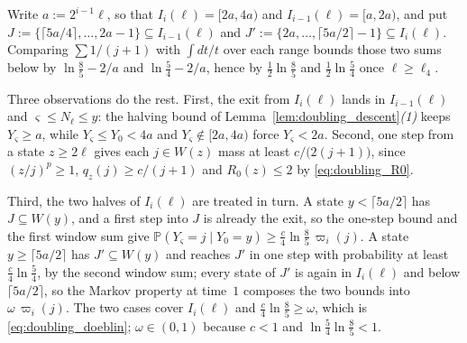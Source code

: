 Write $a:=2^{i-1}\ell$, so that $I_i(\ell)=[2a,4a)$ and $I_{i-1}(\ell)=[a,2a)$, and put
$J:=\{\lceil5a/4\rceil,\dots,2a-1\}\subseteq I_{i-1}(\ell)$ and
$J':=\{2a,\dots,\lceil5a/2\rceil-1\}\subseteq I_i(\ell)$. Comparing $\sum1/(j+1)$ with
$\int dt/t$ over each range bounds those two sums below by $\ln\tfrac85-2/a$ and
$\ln\tfrac54-2/a$, hence by $\tfrac12\ln\tfrac85$ and $\tfrac12\ln\tfrac54$ once
$\ell\geq\ell_4$.

Three observations do the rest. First, the exit from $I_i(\ell)$ lands in $I_{i-1}(\ell)$ and
$\varsigma\leq N_\ell\leq y$: the halving bound of
Lemma~\ref{lem:doubling_descent}\emph{(1)} keeps $Y_\varsigma\geq a$, while
$Y_\varsigma\leq Y_0<4a$ and $Y_\varsigma\notin[2a,4a)$ force $Y_\varsigma<2a$. Second, one
step from a state $z\geq2\ell$ gives each $j\in W(z)$ mass at least $c/\bigl(2(j+1)\bigr)$,
since $(z/j)^{p}\geq1$, $q_z(j)\geq c/(j+1)$ and $R_0(z)\leq2$ by \eqref{eq:doubling_R0}.

Third, the two halves of $I_i(\ell)$ are treated in turn. A state $y<\lceil5a/2\rceil$ has
$J\subseteq W(y)$, and a first step into $J$ is already the exit, so the one-step bound and
the first window sum give
$\mathbb P(Y_\varsigma=j\mid Y_0=y)\geq\tfrac c4\ln\tfrac85\,\varpi_i(j)$. A state
$y\geq\lceil5a/2\rceil$ has $J'\subseteq W(y)$ and reaches $J'$ in one step with probability
at least $\tfrac c4\ln\tfrac54$, by the second window sum; every state of $J'$ is again in $I_i(\ell)$ and below
$\lceil5a/2\rceil$, so the Markov property at time~$1$ composes the two bounds into
$\omega\,\varpi_i(j)$. The two cases cover $I_i(\ell)$ and $\tfrac c4\ln\tfrac85\geq\omega$,
which is \eqref{eq:doubling_doeblin}; $\omega\in(0,1)$ because $c<1$ and
$\ln\tfrac54\ln\tfrac85<1$.

